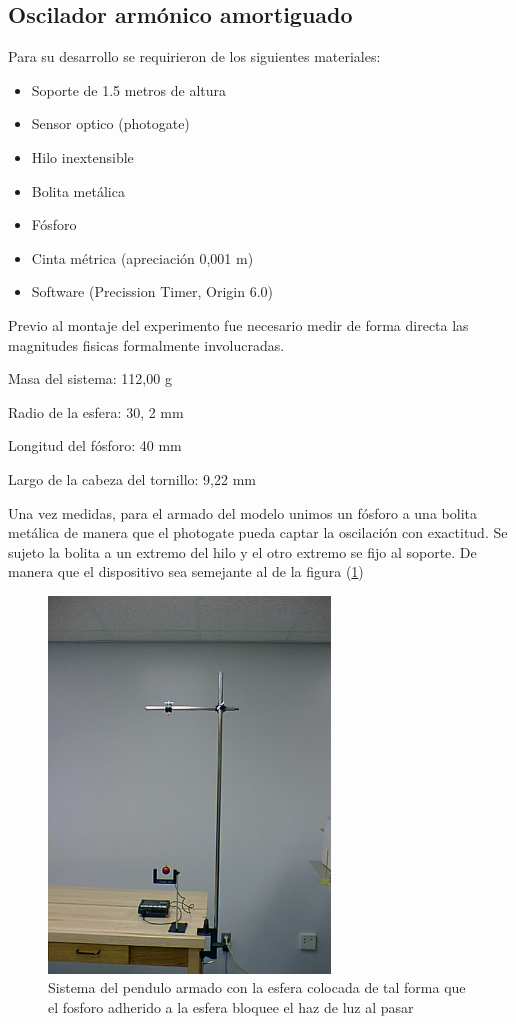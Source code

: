 \documentclass[a4paper,12pt]{article}
\begin{document}
\subsection{Oscilador arm\'onico amortiguado}

Para su desarrollo se requirieron de los siguientes materiales:
\begin{itemize}\item Soporte de 1.5 metros de altura
\item Sensor optico (photogate)
\item Hilo inextensible
\item Bolita metálica
\item Fósforo
\item Cinta métrica (apreciación 0,001 m)
\item Software (Precission Timer, Origin 6.0)
\end{itemize}

Previo al montaje del experimento fue necesario medir de forma directa las magnitudes fisicas formalmente involucradas.

Masa del sistema: 112,00 g

Radio de la esfera: 30, 2 mm

Longitud del fósforo: 40 mm

Largo de la cabeza del tornillo: 9,22 mm


Una vez medidas, para el armado del modelo unimos un fósforo a una bolita metálica de manera que el photogate pueda captar la oscilación con exactitud. Se sujeto la bolita a un extremo del hilo y el otro extremo se fijo al soporte. De manera que el dispositivo sea semejante al de la figura (\ref{figpendulo})

 \begin{figure}[H]
\begin{center}
\includegraphics[height=10cm]{SimplePendulum.jpg}
\caption[width=5cm]{Sistema del pendulo armado con la esfera colocada de tal forma que el fosforo adherido a la esfera bloquee el haz de luz al pasar}
\label{figpendulo}
\end{center}
\end{figure}
\end{document}

